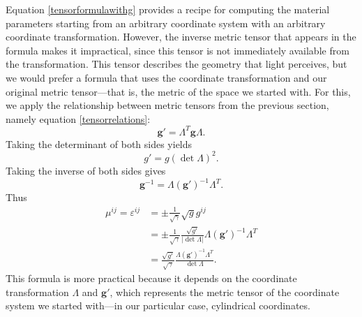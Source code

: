 Equation \eqref{tensorformulawithg} provides a recipe for computing the material
parameters starting from an arbitrary coordinate system with an arbitrary
coordinate transformation. However, the inverse metric tensor that appears in
the formula makes it impractical, since this tensor is not immediately available
from the transformation. This tensor describes the geometry that light perceives, but we would
prefer a formula that uses the coordinate transformation and our
original metric tensor---that is, the metric of the space we started with. For this,
we apply the relationship between metric tensors from the previous
section, namely equation \eqref{tensorrelations}:
\begin{equation*}
	\boldsymbol{g'}=\Lambda^T \boldsymbol{g} \Lambda.
\end{equation*}
Taking the determinant of both sides yields
\[g'=g\left(\det\Lambda\right)^2.\]
Taking the inverse of both sides gives
\[
\boldsymbol{g}^{-1}=\Lambda(\boldsymbol{g}')^{-1}\Lambda^T.
\]
Thus
\begin{align*}
	\mu^{ij}=\varepsilon^{ij}&=\pm\frac{1}{\sqrt{\gamma}}\sqrt{g}g^{ij}\\
		&=\pm\frac{1}{\sqrt{\gamma}}\frac{\sqrt{g'}}{|\det\Lambda|}\Lambda(\boldsymbol{g}')^{-1}\Lambda^T\\
		&=\frac{\sqrt{g'}}{\sqrt{\gamma}}\frac{\Lambda(\boldsymbol{g}')^{-1}\Lambda^T}{\det\Lambda}.
\end{align*}
This formula is more practical because it depends on the coordinate
transformation \(\Lambda\) and \(\boldsymbol{g}'\), which represents the metric tensor
of the coordinate system we started with---in our particular case, cylindrical coordinates.

